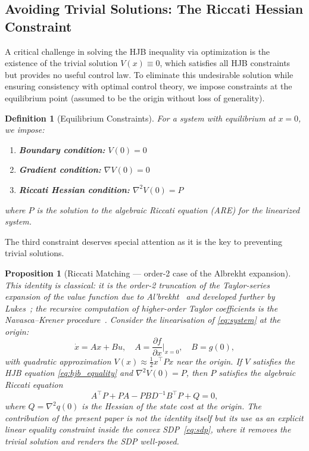 \documentclass[11pt]{article}
\newtheorem{proposition}[theorem]{Proposition}
\newtheorem{definition}[theorem]{Definition}
\begin{document}
\subsection{Avoiding Trivial Solutions: The Riccati Hessian Constraint}
\label{sec:riccati_constraint}

A critical challenge in solving the HJB inequality via optimization is the existence of the trivial solution $V(x) \equiv 0$, which satisfies all HJB constraints but provides no useful control law. To eliminate this undesirable solution while ensuring consistency with optimal control theory, we impose constraints at the equilibrium point (assumed to be the origin without loss of generality).

\begin{definition}[Equilibrium Constraints]
\label{def:equilibrium_constraints}
For a system with equilibrium at $x=0$, we impose:
\begin{enumerate}
\item \textbf{Boundary condition:} $V(0) = 0$
\item \textbf{Gradient condition:} $\nabla V(0) = 0$
\item \textbf{Riccati Hessian condition:} $\nabla^2 V(0) = P$
\end{enumerate}
where $P$ is the solution to the algebraic Riccati equation (ARE) for the linearized system.
\end{definition}

The third constraint deserves special attention as it is the key to preventing trivial solutions.

\begin{proposition}[Riccati Matching --- order-2 case of the Albrekht expansion]
\label{thm:riccati_matching}
This identity is classical: it is the order-2 truncation of the Taylor-series expansion of the value function due to Al'brekht~\cite{albrekht_1961} and developed further by Lukes~\cite{lukes_1969}; the recursive computation of higher-order Taylor coefficients is the Navasca--Krener procedure~\cite{navasca_krener_2000}. Consider the linearisation of \eqref{eq:system} at the origin:
\begin{equation}
\dot{x} = Ax + Bu, \quad A = \frac{\partial f}{\partial x}\bigg|_{x=0}, \quad B = g(0),
\label{eq:linearization}
\end{equation}
with quadratic approximation $V(x) \approx \frac{1}{2}x^\top P x$ near the origin. If $V$ satisfies the HJB equation \eqref{eq:hjb_equality} and $\nabla^2 V(0) = P$, then $P$ satisfies the algebraic Riccati equation
\begin{equation}
A^\top P + PA - PBD^{-1}B^\top P + Q = 0,
\label{eq:are}
\end{equation}
where $Q = \nabla^2 q(0)$ is the Hessian of the state cost at the origin. The contribution of the present paper is not the identity itself but its use as an explicit linear equality constraint inside the convex SDP~\eqref{eq:sdp}, where it removes the trivial solution and renders the SDP well-posed.
\end{proposition}
\end{document}

